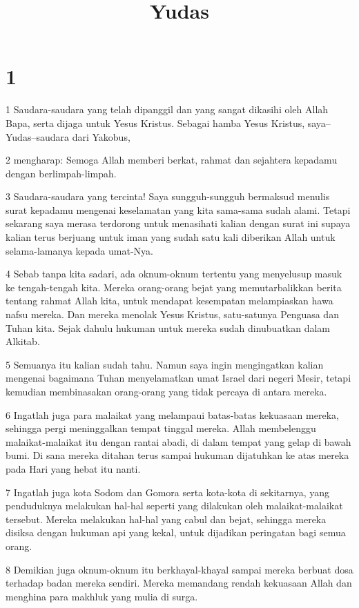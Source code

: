 

\title{Yudas}


\chapter{1}

\par 1 Saudara-saudara yang telah dipanggil dan yang sangat dikasihi oleh Allah Bapa, serta dijaga untuk Yesus Kristus. Sebagai hamba Yesus Kristus, saya--Yudas--saudara dari Yakobus,
\par 2 mengharap: Semoga Allah memberi berkat, rahmat dan sejahtera kepadamu dengan berlimpah-limpah.
\par 3 Saudara-saudara yang tercinta! Saya sungguh-sungguh bermaksud menulis surat kepadamu mengenai keselamatan yang kita sama-sama sudah alami. Tetapi sekarang saya merasa terdorong untuk menasihati kalian dengan surat ini supaya kalian terus berjuang untuk iman yang sudah satu kali diberikan Allah untuk selama-lamanya kepada umat-Nya.
\par 4 Sebab tanpa kita sadari, ada oknum-oknum tertentu yang menyelusup masuk ke tengah-tengah kita. Mereka orang-orang bejat yang memutarbalikkan berita tentang rahmat Allah kita, untuk mendapat kesempatan melampiaskan hawa nafsu mereka. Dan mereka menolak Yesus Kristus, satu-satunya Penguasa dan Tuhan kita. Sejak dahulu hukuman untuk mereka sudah dinubuatkan dalam Alkitab.
\par 5 Semuanya itu kalian sudah tahu. Namun saya ingin mengingatkan kalian mengenai bagaimana Tuhan menyelamatkan umat Israel dari negeri Mesir, tetapi kemudian membinasakan orang-orang yang tidak percaya di antara mereka.
\par 6 Ingatlah juga para malaikat yang melampaui batas-batas kekuasaan mereka, sehingga pergi meninggalkan tempat tinggal mereka. Allah membelenggu malaikat-malaikat itu dengan rantai abadi, di dalam tempat yang gelap di bawah bumi. Di sana mereka ditahan terus sampai hukuman dijatuhkan ke atas mereka pada Hari yang hebat itu nanti.
\par 7 Ingatlah juga kota Sodom dan Gomora serta kota-kota di sekitarnya, yang penduduknya melakukan hal-hal seperti yang dilakukan oleh malaikat-malaikat tersebut. Mereka melakukan hal-hal yang cabul dan bejat, sehingga mereka disiksa dengan hukuman api yang kekal, untuk dijadikan peringatan bagi semua orang.
\par 8 Demikian juga oknum-oknum itu berkhayal-khayal sampai mereka berbuat dosa terhadap badan mereka sendiri. Mereka memandang rendah kekuasaan Allah dan menghina para makhluk yang mulia di surga.
